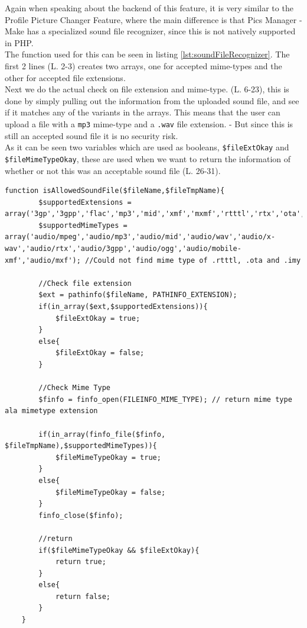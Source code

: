 Again when speaking about the backend of this feature, it is very similar to the Profile Picture Changer Feature, where the main difference is that Pics Manager - Make has a specialized sound file recognizer, since this is not natively supported in PHP.\\
The function used for this can be seen in listing \ref{lst:soundFileRecognizer}. The first 2 lines (L. 2-3) creates two arrays, one for accepted mime-types and the other for accepted file extensions.\\
Next we do the actual check on file extension and mime-type. (L. 6-23), this is done by simply pulling out the information from the uploaded sound file, and see if it matches any of the variants in the arrays. This means that the user can upload a file with a \texttt{mp3} mime-type and a \texttt{.wav} file extension. - But since this is still an accepted sound file it is no security risk.\\
As it can be seen two variables which are used as booleans, \texttt{\$fileExtOkay} and \texttt{\$fileMimeTypeOkay}, these are used when we want to return the information of whether or not this was an acceptable sound file (L. 26-31).

\lstset{language=PHP}
\begin{lstlisting}[firstline=1,caption={The function used for checking sound files.},label=lst:soundFileRecognizer]
	function isAllowedSoundFile($fileName,$fileTmpName){
		$supportedExtensions = array('3gp','3gpp','flac','mp3','mid','xmf','mxmf','rtttl','rtx','ota','imy','ogg','wav');
		$supportedMimeTypes = array('audio/mpeg','audio/mp3','audio/mid','audio/wav','audio/x-wav','audio/rtx','audio/3gpp','audio/ogg','audio/mobile-xmf','audio/mxf'); //Could not find mime type of .rtttl, .ota and .imy
		
		//Check file extension
		$ext = pathinfo($fileName, PATHINFO_EXTENSION);
		if(in_array($ext,$supportedExtensions)){
			$fileExtOkay = true;
		}
		else{
			$fileExtOkay = false;
		}
		
		//Check Mime Type
		$finfo = finfo_open(FILEINFO_MIME_TYPE); // return mime type ala mimetype extension
		
		if(in_array(finfo_file($finfo, $fileTmpName),$supportedMimeTypes)){
			$fileMimeTypeOkay = true;
		}
		else{
			$fileMimeTypeOkay = false;
		}
		finfo_close($finfo);
		
		//return
		if($fileMimeTypeOkay && $fileExtOkay){
			return true;
		}
		else{
			return false;
		}
	}
\end{lstlisting}

